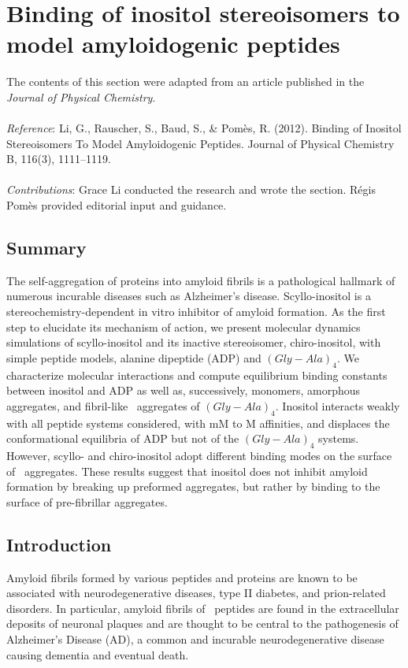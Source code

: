 \chapter{Binding of inositol stereoisomers to model amyloidogenic peptides}

The contents of this section were adapted from an article published in the \emph{Journal of Physical Chemistry}.
\\
\\
\emph{Reference}:
Li, G., Rauscher, S., Baud, S., & Pomès, R. (2012). Binding of Inositol Stereoisomers To Model Amyloidogenic Peptides. Journal of Physical Chemistry B, 116(3), 1111–1119.
\\
\\
\emph{Contributions}:
Grace Li conducted the research and wrote the section. Régis Pomès provided editorial input and guidance.

\newpage

\section{Summary}
The self-aggregation of proteins into amyloid fibrils is a pathological hallmark of numerous incurable diseases such as Alzheimer's disease. Scyllo-inositol is a stereochemistry-dependent in vitro inhibitor of amyloid formation. As the first step to elucidate its mechanism of action, we present molecular dynamics simulations of scyllo-inositol and its inactive stereoisomer, chiro-inositol, with simple peptide models, alanine dipeptide (ADP) and $(Gly-Ala)_4$. We characterize molecular interactions and compute equilibrium binding constants between inositol and ADP as well as, successively, monomers, amorphous aggregates, and fibril-like \bsheet\ aggregates of $(Gly-Ala)_4$.\cite{Balbach:2000p49}
Inositol interacts weakly with all peptide systems considered, with mM to M affinities, and displaces the conformational equilibria of ADP but not of the $(Gly-Ala)_4$ systems. However, scyllo- and chiro-inositol adopt different binding modes on the surface of \bsheet\ aggregates. These results suggest that inositol does not inhibit amyloid formation by breaking up preformed aggregates, but rather by binding to the surface of pre-fibrillar aggregates.

\section{Introduction}
Amyloid fibrils formed by various peptides and proteins are known to be associated with neurodegenerative diseases, type II diabetes, and prion-related disorders.\cite{Chiti:2006p20} In particular, amyloid fibrils of \abeta\ peptides are found in the extracellular deposits of neuronal plaques and are thought to be central to the pathogenesis of Alzheimer’s Disease (AD),\cite{Chiti:2006p20,Hardy:2002p27} a common and incurable neurodegenerative disease causing dementia and eventual death. 

